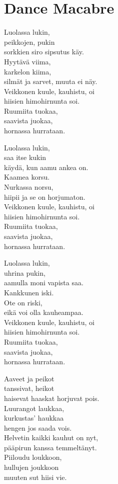 \section{Dance Macabre}

Luolassa lukin,\\
peikkojen, pukin\\
sorkkien siro sipsutus käy.\\
Hyytävä viima,\\
karkelon kiima,\\
silmät ja sarvet, muuta ei näy.\\
Veikkonen kuule, kauhistu, oi\\
hiisien himohirnunta soi.\\
Ruumiita tuokaa,\\
saavista juokaa,\\
hornassa hurrataan.

Luolassa lukin,\\
saa itse kukin\\
käydä, kun aamu ankea on.\\
Kaamea korsu.\\
Nurkassa norsu,\\
hiipii ja se on horjumaton.\\
Veikkonen kuule, kauhistu, oi\\
hiisien himohirnunta soi.\\
Ruumiita tuokaa,\\
saavista juokaa,\\
hornassa hurrataan.



Luolassa lukin,\\
uhrina pukin,\\
aamulla moni vapista saa.\\
Kankkunen iski.\\
Ote on riski,\\
eikä voi olla kauheampaa.\\
Veikkonen kuule, kauhistu, oi\\
hiisien himohirnunta soi.\\
Ruumiita tuokaa,\\
saavista juokaa,\\
hornassa hurrataan.



Aaveet ja peikot\\
tanssivat, heikot\\
haisevat haaskat horjuvat pois.\\
Luurangot laukkaa,\\
kurkustas’ haukkaa\\
hengen jos saada vois.\\
Helvetin kaikki kauhut on nyt,\\
pääpirun kanssa temmeltänyt.\\
Piiloudu loukkoon,\\
hullujen joukkoon\\
muuten sut hiisi vie.